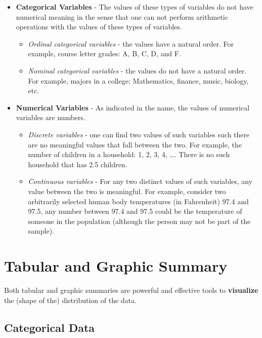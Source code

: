 \documentclass[
]{book}
\begin{document}
\begin{itemize}
\item
  \textbf{Categorical Variables} - The values of these types of variables do not have numerical meaning in the sense that one can not perform arithmetic operations with the values of these types of variables.

  \begin{itemize}
  \item
    \emph{Ordinal categorical variables} - the values have a natural order. For example, course letter grades: A, B, C, D, and F.
  \item
    \emph{Nominal categorical variables} - the values do not have a natural order. For example, majors in a college: Mathematics, finance, music, biology, etc.
  \end{itemize}
\item
  \textbf{Numerical Variables} - As indicated in the name, the values of numerical variables are numbers.

  \begin{itemize}
  \item
    \emph{Discrete variables} - one can find two values of such variables such there are no meaningful values that fall between the two. For example, the number of children in a household: 1, 2, 3, 4, \ldots. There is no such household that has 2.5 children.
  \item
    \emph{Continuous variables} - For any two distinct values of such variables, any value between the two is meaningful. For example, consider two arbitrarily selected human body temperatures (in Fahrenheit) 97.4 and 97.5, any number between 97.4 and 97.5 could be the temperature of someone in the population (although the person may not be part of the sample).
  \end{itemize}
\end{itemize}

\hypertarget{tabular-and-graphic-summary}{%
\section{Tabular and Graphic Summary}\label{tabular-and-graphic-summary}}

Both tabular and graphic summaries are powerful and effective tools to \textbf{visualize} the (shape of the) distribution of the data.

\hypertarget{categorical-data}{%
\subsection{Categorical Data}\label{categorical-data}}
\end{document}
